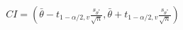 \begin{align*}
    CI = \left(\bar{\theta} - t_{1-\alpha/2, v} \frac{s_{\theta^*}}{\sqrt{n}} , \bar{\theta} + t_{1-\alpha/2, v}  \frac{s_{\theta^*}}{\sqrt{n}} \right)
\end{align*}
